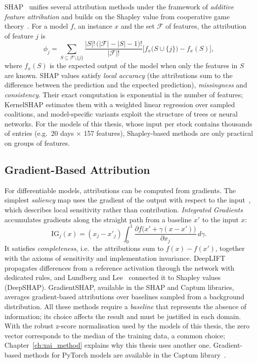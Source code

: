 SHAP~\cite{lundberg2017shap} unifies several attribution methods under the framework of \emph{additive feature attribution} and builds on the Shapley value from cooperative game theory~\cite{shapley1953value}. For a model $f$, an instance $x$ and the set $\mathcal{F}$ of features, the attribution of feature $j$ is
\begin{equation}
    \label{eq:rw_shapley}
    \phi_j = \sum_{S \subseteq \mathcal{F} \setminus \{j\}} \frac{|S|!\,\big(|\mathcal{F}| - |S| - 1\big)!}{|\mathcal{F}|!} \Big[ f_x\big(S \cup \{j\}\big) - f_x(S) \Big],
\end{equation}
where $f_x(S)$ is the expected output of the model when only the features in $S$ are known. SHAP values satisfy \emph{local accuracy} (the attributions sum to the difference between the prediction and the expected prediction), \emph{missingness} and \emph{consistency}. Their exact computation is exponential in the number of features; KernelSHAP estimates them with a weighted linear regression over sampled coalitions, and model-specific variants exploit the structure of trees or neural networks. For the models of this thesis, whose input per stock contains thousands of entries (e.g.\ 20 days $\times$ 157 features), Shapley-based methods are only practical on groups of features.

\subsection{Gradient-Based Attribution}

For differentiable models, attributions can be computed from gradients. The simplest \emph{saliency} map uses the gradient of the output with respect to the input~\cite{simonyan2014deep}, which describes local sensitivity rather than contribution. \emph{Integrated Gradients}~\cite{sundararajan2017axiomatic} accumulates gradients along the straight path from a baseline $x'$ to the input $x$:
\begin{equation}
    \label{eq:rw_ig}
    \mathrm{IG}_j(x) = (x_j - x'_j) \int_{0}^{1} \frac{\partial f\big(x' + \gamma (x - x')\big)}{\partial x_j} \, d\gamma .
\end{equation}
It satisfies \emph{completeness}, i.e.\ the attributions sum to $f(x) - f(x')$, together with the axioms of sensitivity and implementation invariance. DeepLIFT~\cite{shrikumar2017learning} propagates differences from a reference activation through the network with dedicated rules, and Lundberg and Lee~\cite{lundberg2017shap} connected it to Shapley values (DeepSHAP). GradientSHAP, available in the SHAP and Captum libraries, averages gradient-based attributions over baselines sampled from a background distribution. All these methods require a \emph{baseline} that represents the absence of information; its choice affects the result and must be justified in each domain. With the robust z-score normalisation used by the models of this thesis, the zero vector corresponds to the median of the training data, a common choice; Chapter~\ref{ch:xai_method} explains why this thesis uses another one. Gradient-based methods for PyTorch models are available in the Captum library~\cite{kokhlikyan2020captum}.

